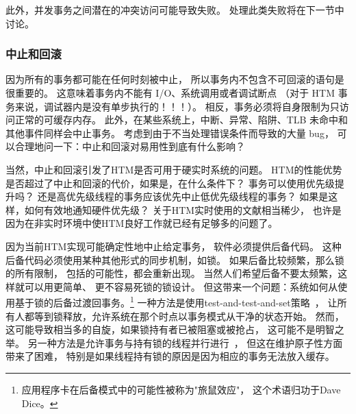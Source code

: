 此外，并发事务之间潜在的冲突访问可能导致失败。
处理此类失败将在下一节中讨论。

\subsubsection{中止和回滚}
\label{sec:future:Aborts and Rollbacks}

因为所有的事务都可能在任何时刻被中止，
所以事务内不包含不可回滚的语句是很重要的。
这意味着事务内不能有 I/O、系统调用或者调试断点
（对于 HTM 事务来说，调试器内是没有单步执行的！！！）。
相反，事务必须将自身限制为只访问正常的可缓存内存。
此外，在某些系统上，中断、异常、陷阱、TLB 未命中和其他事件同样会中止事务。
考虑到由于不当处理错误条件而导致的大量 bug，
可以合理地问一下：中止和回滚对易用性到底有什么影响？

\QuickQuizEnd

当然，中止和回滚引发了HTM是否可用于硬实时系统的问题。
HTM的性能优势是否超过了中止和回滚的代价，如果是，在什么条件下？
事务可以使用优先级提升吗？
还是高优先级线程的事务应该优先中止低优先级线程的事务？
如果是这样，如何有效地通知硬件优先级？
关于HTM实时使用的文献相当稀少，
也许是因为在非实时环境中使HTM良好工作就已经有足够多的问题了。

因为当前HTM实现可能确定性地中止给定事务，
软件必须提供后备代码。
这种后备代码必须使用某种其他形式的同步机制，如锁。
如果后备比较频繁，那么锁的所有限制，
包括的可能性，都会重新出现。
当然人们希望后备不要太频繁，这样就可以用更简单、
更不容易死锁的锁设计。
但这带来一个问题：系统如何从使用基于锁的后备过渡回事务。\footnote{
	应用程序卡在后备模式中的可能性被称为"旅鼠效应"，
	这个术语归功于Dave Dice。}
一种方法是使用test-and-test-and-set策略~\cite{Martinez02a}，
让所有人都等到锁释放，允许系统在那个时点以事务模式从干净的状态开始。
然而，这可能导致相当多的自旋，如果锁持有者已被阻塞或被抢占，
这可能不是明智之举。
另一种方法是允许事务与持有锁的线程并行进行~\cite{Martinez02a}，
但这在维护原子性方面带来了困难，
特别是如果线程持有锁的原因是因为相应的事务无法放入缓存。


